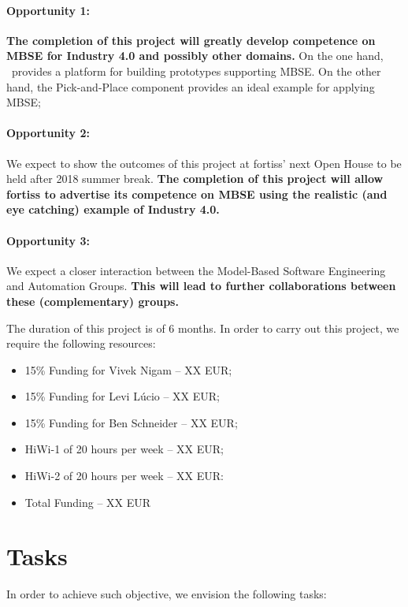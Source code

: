 \paragraph{Opportunity 1:} \textbf{The completion of this project will greatly develop competence on MBSE for Industry 4.0 and possibly other domains.}  On the one hand, \autofocus\ provides a platform for building prototypes supporting MBSE. On the other hand, the Pick-and-Place component provides an ideal example for applying MBSE;

\paragraph{Opportunity 2:} We expect to show the outcomes of this project at fortiss' next Open House to be held after 2018 summer break. \textbf{The completion of this project will allow fortiss to advertise its competence on MBSE using the realistic (and eye catching) example of Industry 4.0.}

\paragraph{Opportunity 3:} We expect a closer interaction between the Model-Based Software Engineering and Automation Groups. \textbf{This will lead to further collaborations between these (complementary) groups.}

\bigskip


The duration of this project is of 6 months. In order to carry out this project, we require the following resources:

\begin{itemize}
  \item 15\% Funding for Vivek Nigam -- XX EUR;
  \item 15\% Funding for Levi L\'ucio -- XX EUR;
  \item 15\% Funding for Ben Schneider -- XX EUR;
  \item HiWi-1 of 20 hours per week -- XX EUR;
  \item HiWi-2 of 20 hours per week -- XX EUR:
  \item Total Funding -- XX EUR
\end{itemize}

\section{Tasks}

In order to achieve such objective, we envision the following tasks:

